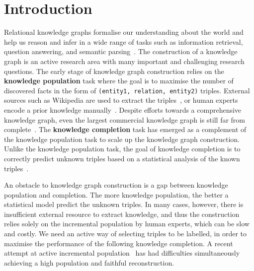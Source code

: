 
\section{Introduction}
\label{sec:intro}

Relational knowledge graphs formalise our understanding about the world
and help us reason and infer in a wide range of tasks such as information retrieval, question answering, and semantic parsing~\cite{Dong2015,jiang2015improving}.
The construction of a knowledge graph is an active research area with many important and challenging research questions.
The early stage of knowledge graph construction relies on the {\bf knowledge population} task
where the goal is to maximise the number of discovered facts in the form of \texttt{(entity1, relation, entity2)} triples.
External sources such as Wikipedia are used to extract the triples~\cite{hoffart2013yago2},
or human experts encode a prior knowledge manually~\cite{bollacker2008freebase}.
Despite efforts towards a comprehensive knowledge graph,
even the largest commercial knowledge graph is still far from complete~\cite{dong2014knowledge}.
The {\bf knowledge completion} task has emerged as a complement of the knowledge population task
to scale up the knowledge graph construction.
Unlike the knowledge population task, the goal of knowledge completion is to correctly predict unknown triples based on a statistical analysis of the known triples~\cite{Lao2010,nickel2011three}.

An obstacle to knowledge graph construction is a gap between knowledge
population and completion. The more knowledge population, the better a statistical model predict the unknown triples. In many cases, however, there is insufficient external resource to extract knowledge, and thus the construction relies solely on the incremental population by human experts, which can be slow and costly.
We need an active way of selecting triples to be labelled, in order to maximise the performance of the following knowledge completion.
A recent attempt at active incremental population~\cite{kajino2015active}
has had difficulties simultaneously achieving a high population and faithful reconstruction.

